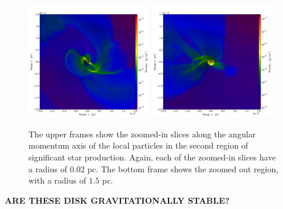 \documentclass{emulateapj}
\begin{document}
\begin{figure}
\includegraphics[width=0.48\textwidth]{movie_disk_0132_0002.png}
\includegraphics[width=0.48\textwidth]{movie_disk_0132_0004.png}
\caption{The upper frames show the zoomed-in slices along the angular momentum axis of the local particles in the second region of significant star production.  Again, each of the zoomed-in slices have a radius of $0.02$ pc.  The bottom frame shows the zoomed out region, with a radius of $1.5$ pc.  \label{fig:snapshots 2}}
\end{figure}

{\bf ARE THESE DISK GRAVITATIONALLY STABLE?}
\end{document}
